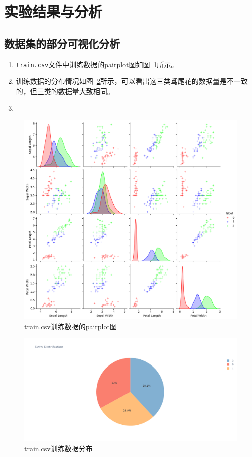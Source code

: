 \documentclass[12pt]{article}
\begin{document}
\section{实验结果与分析}
\subsection{数据集的部分可视化分析}
\begin{enumerate}
  \item \texttt{train.csv}文件中训练数据的pairplot图如图~\ref{fig:pairplot}所示。
  \item 训练数据的分布情况如图~\ref{fig:pie}所示，可以看出这三类鸢尾花的数据量是不一致的，但三类的数据量大致相同。
  \item
\end{enumerate}

\begin{figure}[htbp]
  \centering
  \includegraphics[scale=0.45]{figures/knn/pairplot.png}
  \caption{train.csv训练数据的pairplot图}
  \label{fig:pairplot}
\end{figure}

\begin{figure}[htbp]
  \centering
  \includegraphics[scale=0.4]{figures/knn/distribution.png}
  \caption{train.csv训练数据分布}
  \label{fig:pie}
\end{figure}
\end{document}
